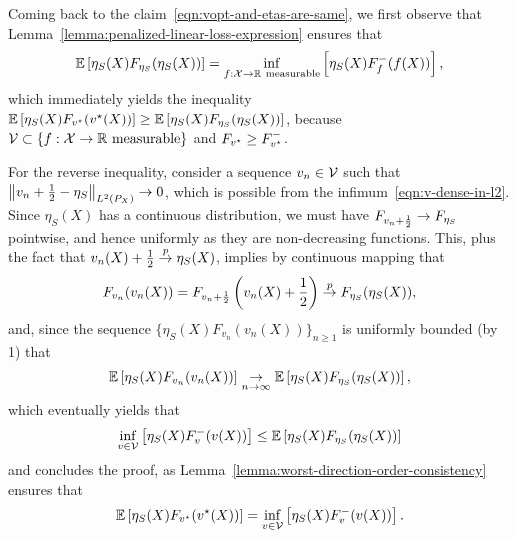 Coming back to the claim~\eqref{eqn:vopt-and-etas-are-same},  we first observe that Lemma~\ref{lemma:penalized-linear-loss-expression} ensures that
\begin{align*}
\mathbb{E}\left[ \eta_S(X) F_{\eta_S}(\eta_S(X)) \right] = \inf_{f: \mathcal{X} \to \mathbb{R} ~ \text{measurable}} \left[ \eta_S(X) F_f^-(f(X)) \right],
\end{align*}
which immediately yields the inequality $\mathbb{E}\left[ \eta_S(X) F_{v^\star}(v^\star(X))
  \right] \ge \mathbb{E}\left[ \eta_S(X) F_{\eta_S}(\eta_S(X)) \right]$, because
$\mathcal{V} \subset \{f: \mathcal{X} \to \mathbb{R} \text{ measurable} \}$ and $F_{v^\star} \ge
F_{v^\star}^-$.


For the reverse inequality,  consider a sequence $v_n \in \mathcal{V}$ such that $\left\|{v_n + \frac{1}{2} - \eta_S}\right\|_{L^2(P_X)} \to 0$, which is possible from the infimum~\eqref{eqn:v-dense-in-l2}. 
Since $\eta_S(X)$ has a continuous distribution, we must have $F_{v_n + \frac{1}{2}} \to F_{\eta_S}$ pointwise, and hence uniformly as they are non-decreasing functions.
This, plus the fact that $v_n(X)+\frac{1}{2} \stackrel{p}{\rightarrow} \eta_S(X)$,  implies by continuous mapping that
\begin{align*}
F_{v_n}(v_n(X))  = F_{v_n+\frac{1}{2}}\left(v_n(X)+\frac{1}{2}\right) \stackrel{p}{\rightarrow} F_{\eta_S}(\eta_S(X)),
\end{align*} and, since the sequence $\{ \eta_S(X) F_{v_n}(v_n(X)) \}_{n \ge 1}$ is uniformly bounded (by 1) that
\begin{align*}
\mathbb{E}\left[ \eta_S(X) F_{v_n}(v_n(X)) \right] \underset{n \to \infty}{\rightarrow} \mathbb{E}\left[ \eta_S(X) F_{\eta_S}(\eta_S(X)) \right],
\end{align*}
which eventually yields that
\begin{align*}
\inf_{v \in \mathcal{V}} \left[ \eta_S(X) F_v^-(v(X)) \right] \le \mathbb{E}\left[ \eta_S(X) F_{\eta_S}(\eta_S(X)) \right]
\end{align*}
and concludes the proof, as Lemma~\ref{lemma:worst-direction-order-consistency} ensures that
\begin{align*}
\mathbb{E}\left[ \eta_S(X) F_{v^\star}(v^\star(X)) \right] = \inf_{v \in \mathcal{V}} \left[ \eta_S(X) F_v^-(v(X)) \right].
\end{align*}

